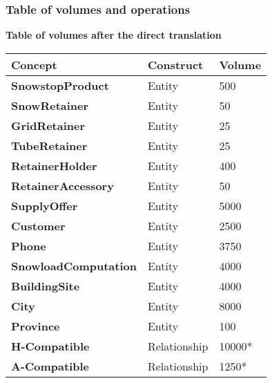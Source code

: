 {\vspace{12px}

\subsubsection{Table of volumes and operations}

{\centering \textbf{Table of volumes after the direct translation}\\}

\begin{table}[H]
  \def\arraystretch{1.25}%
  \centering
  \begin{tabular}{ | m{4.5cm} | m{4.5cm}| m{4.5cm} |}
    \hline
    {\textbf{\large Concept}} & {\textbf{\large Construct}} & {\textbf{\large Volume}} \\
    \hline
    \color[HTML]{3531FF} \textbf{SnowstopProduct} & Entity & 500  \\
    \hline
    \color[HTML]{3531FF} \textbf{SnowRetainer} & Entity & 50 \\
    \hline
    \color[HTML]{3531FF} \textbf{GridRetainer} & Entity & 25 \\
    \hline
    \color[HTML]{3531FF} \textbf{TubeRetainer} & Entity & 25 \\
    \hline
    \color[HTML]{3531FF} \textbf{RetainerHolder} & Entity & 400 \\
    \hline
    \color[HTML]{3531FF} \textbf{RetainerAccessory} & Entity & 50 \\
    \hline
    \color[HTML]{3531FF} \textbf{SupplyOffer} & Entity & 5000\\
    \hline
    \color[HTML]{3531FF} \textbf{Customer} & Entity & 2500\\
    \hline
    \color[HTML]{3531FF} \textbf{Phone} & Entity & 3750 \\
    \hline
    \color[HTML]{3531FF} \textbf{SnowloadComputation} & Entity & 4000\\
    \hline
    \color[HTML]{3531FF} \textbf{BuildingSite} & Entity & 4000\\
    \hline
    \color[HTML]{3531FF} \textbf{City} & Entity & 8000 \\
    \hline
    \color[HTML]{3531FF} \textbf{Province} & Entity & 100 \\
    \hline
    \color[HTML]{3531FF} \textbf{H-Compatible} & Relationship & 10000* \\
    \hline
    \color[HTML]{3531FF} \textbf{A-Compatible} & Relationship & 1250* \\

\end{tabular}
\end{table}}
